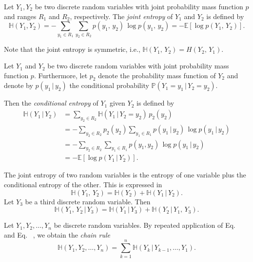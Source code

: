 \documentclass[smallextended]{svjour3}
\makeatletter
\renewcommand*{\eqref}[1]{%
  \hyperref[{#1}]{\textup{\tagform@{\ref*{#1}}}}%
}
\renewcommand{\P}{\mathbb{P}}
\newcommand{\E}{\mathbb{E}}
\renewcommand{\H}{\mathbb{H}}
\newcommand{\suml}{\sum\limits}
\newcommand{\ie}{i.e.}
\makeatother
\begin{document}
\begin{definition}%
		Let $Y_1,Y_2$ be two discrete random variables with joint probability mass function $p$ and ranges $R_1$ and $R_2$, respectively.
		The \emph{joint entropy} of $Y_1$ and $Y_2$ is defined by
		\begin{equation*}
			\H(Y_1,Y_2) = -\suml_{y_1\in R_1}\suml_{y_2\in R_2} p(y_1,\,y_2)\,\log p(y_1,\,y_2) = -\E\left[\log p(Y_1,\,Y_2)\right].
		\end{equation*}
\end{definition}

Note that the joint entropy is symmetric, \ie, $\H(Y_1,\,Y_2) = H(Y_2,\,Y_1)$.

\begin{definition}%
\label{def:conditional_entropy}
	Let $Y_1$ and $Y_2$ be two discrete random variables with joint probability mass function $p$.
	Furthermore, let $p_2$ denote the probability mass function of $Y_2$ and denote by $p(y_1\,|\,y_2)$ the conditional probability $\P(Y_1=y_1\,|\,Y_2=y_2)$.
	
	Then the \emph{conditional entropy} of $Y_1$ given $Y_2$ is defined by
	\begin{equation*}
		\begin{aligned}
			\H(Y_1\,|\,Y_2) &= \suml_{y_2\in R_2} \H(Y_1\,|\,Y_2=y_2)\,p_2(y_2)\\
			&= -\suml_{y_2\in R_2} p_2(y_2)\suml_{y_1\in R_1}p(y_1\,|\,y_2)\,\log p(y_1\,|\,y_2)\\
			&= -\suml_{y_2\in R_2}\suml_{y_1\in R_1} p(y_1,y_2)\,\log p(y_1\,|\,y_2)\\
			&= -\E\left[\log p(Y_1\,|\,Y_2)\right].
		\end{aligned}
	\end{equation*}
\end{definition}

The joint entropy of two random variables is the entropy of one variable plus the conditional entropy of the other.
This is expressed in 
\begin{equation}\label{eqn:two_expansion_rule}
	\H(Y_1,\,Y_2) = \H(Y_2) + \H(Y_1\,|\,Y_2).
\end{equation}
Let $Y_3$ be a third discrete random variable.
Then
\begin{equation}\label{eqn:three_expansion_rule}
	\H(Y_1,\,Y_2\,|\,Y_3) = \H(Y_1\,|\,Y_3) + \H(Y_2\,|\,Y_1,\,Y_3).
\end{equation}

Let $Y_1,Y_2,\ldots,Y_n$ be discrete random variables.
By repeated application of Eq.~\eqref{eqn:two_expansion_rule} and Eq.~\eqref{eqn:three_expansion_rule}, we obtain the \emph{chain rule}
\begin{equation}\label{eqn:chain_rule}
	\H(Y_1,Y_2,\ldots,Y_n) = \suml_{k=1}^n \H(Y_k\,|\,Y_{k-1},\ldots,Y_1).
\end{equation}
\end{document}
